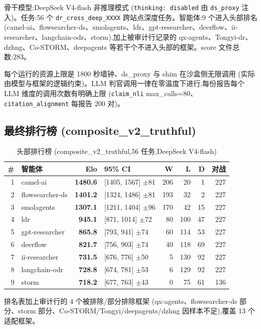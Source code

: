 \documentclass[UTF8,a4paper,12pt,oneside]{ctexart}
\begin{document}
骨干模型:DeepSeek V4-flash 非推理模式 (\texttt{thinking: disabled} 由 \texttt{ds\_proxy} 注入)。任务:56 个 \texttt{dr\_cross\_deep\_XXXX} 跨站点深度任务。智能体:9 个进入头部排名 (camel-ai、flowsearcher-ds、smolagents、ldr、gpt-researcher、deerflow、ii-researcher、langchain-odr、storm),加上被审计行记录的 qx-agents、Tongyi-dr、dzhng、Co-STORM、deepagents 等若干个不进入头部的框架。score 文件总数:283。

每个运行的资源上限是 1800 秒墙钟、ds\_proxy 与 shim 在沙盒侧无限调用 (实际由模型与框架的逻辑约束)。LLM 判官调用一律在零温度下进行,每份报告每个 LLM 维度的调用次数有明确上限 (\texttt{claim\_nli} max\_calls=80、\texttt{citation\_alignment} 每报告 200 对)。

\subsection{最终排行榜 (composite\_v2\_truthful)}

\begin{table}[ht]
\centering
\small
\caption{头部排行榜 (composite\_v2\_truthful,56 任务,DeepSeek V4-flash)}
\label{tab:headline}
\begin{tabular}{r l r l r r r r}
\toprule
\# & 智能体 & Elo & 95\% CI & W & L & D & 对战 \\
\midrule
1 & camel-ai & \textbf{1480.6} & [1405, 1567] $\pm$81 & 206 & 20 & 1 & 227 \\
2 & flowsearcher-ds & \textbf{1401.2} & [1324, 1486] $\pm$81 & 193 & 32 & 2 & 227 \\
3 & smolagents & \textbf{1307.1} & [1211, 1404] $\pm$96 & 170 & 42 & 15 & 227 \\
4 & ldr & \textbf{945.1} & [871, 1014] $\pm$72 & 80 & 100 & 47 & 227 \\
5 & gpt-researcher & \textbf{865.8} & [793, 941] $\pm$74 & 60 & 114 & 53 & 227 \\
6 & deerflow & \textbf{821.7} & [756, 903] $\pm$74 & 40 & 118 & 69 & 227 \\
7 & ii-researcher & \textbf{731.5} & [676, 776] $\pm$50 & 5 & 130 & 92 & 227 \\
8 & langchain-odr & \textbf{728.8} & [674, 781] $\pm$53 & 6 & 129 & 92 & 227 \\
9 & storm & \textbf{718.2} & [677, 763] $\pm$43 & 0 & 75 & 61 & 136 \\
\bottomrule
\end{tabular}
\end{table}

排名表加上审计行的 4 个被排除/部分排除框架 (qx-agents、flowsearcher-ds 部分、storm 部分、Co-STORM/Tongyi/deepagents/dzhng 因样本不足),覆盖 13 个适配框架。
\end{document}
